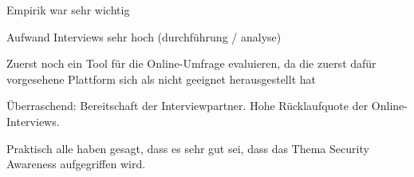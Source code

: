 \begin{sloppypar}
Empirik war sehr wichtig

Aufwand Interviews sehr hoch (durchführung / analyse)

Zuerst noch ein Tool für die Online-Umfrage evaluieren, da die zuerst dafür vorgesehene Plattform sich als nicht geeignet herausgestellt hat

Überraschend: Bereitschaft der Interviewpartner. Hohe Rücklaufquote der Online-Interviews.

Praktisch alle haben gesagt, dass es sehr gut sei, dass das Thema Security Awareness aufgegriffen wird.

\end{sloppypar}